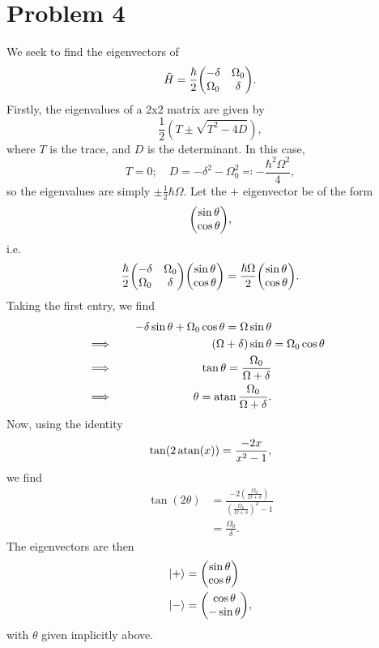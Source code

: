 \documentclass[12pt]{article}
\begin{document}
\section*{Problem 4}
We seek to find the eigenvectors of 
\[ \tilde{H} = \frac{\hbar}{2}\mqty(-\delta&\Omega_0\\\Omega_0&\delta). \]
Firstly, the eigenvalues of a 2x2 matrix are given by
\[ \frac{1}{2}\left(T \pm \sqrt{T^2 - 4D}\right), \]
where $T$ is the trace, and $D$ is the determinant. In this case,
\[ T = 0; \quad D = -\delta^2 - \Omega_0^2 \eqqcolon -\frac{\hbar^2\Omega^2}{4}, \]
so the eigenvalues are simply $\pm\frac{1}{2}\hbar\Omega$. Let the $+$ eigenvector be of the form
\[ \mqty(\sin\theta\\\cos\theta), \]
i.e.
\[ \frac{\hbar}{2}\mqty(-\delta&\Omega_0\\\Omega_0&\delta)\mqty(\sin\theta\\\cos\theta) = \frac{\hbar\Omega}{2}\mqty(\sin\theta\\\cos\theta). \]
Taking the first entry, we find
\begin{alignat*}{3}
    &\quad & -\delta\sin\theta + \Omega_0\cos\theta = \Omega\sin\theta \\
    &\implies\quad & (\Omega + \delta)\sin\theta &= \Omega_0\cos\theta \\
    &\implies\quad & \tan\theta = \frac{\Omega_0}{\Omega + \delta} \\
    &\implies\quad & \theta = \atan\frac{\Omega_0}{\Omega + \delta}.
\end{alignat*}
Now, using the identity
\[ \tan(2\atan(x)) = \frac{-2x}{x^2 - 1},  \]
we find
\begin{align*}
    \tan(2\theta) &= \frac{-2\left(\frac{\Omega_0}{\Omega + \delta}\right)}{\left(\frac{\Omega_0}{\Omega + \delta}\right)^2 - 1} \\
    &= \frac{\Omega_0}{\delta}.
\end{align*}
The eigenvectors are then
\begin{align*}
    \ket{+} &= \mqty(\sin\theta\\\cos\theta) \\
    \ket{-} &= \mqty(\cos\theta\\-\sin\theta),
\end{align*}
with $\theta$ given implicitly above.
\end{document}

